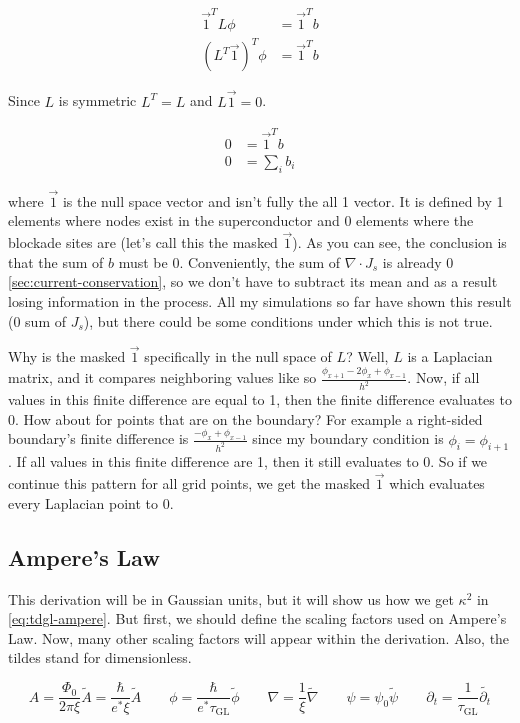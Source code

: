 \documentclass[11pt]{article}
\theoremstyle{definition}
\begin{document}
\begin{align}
\vec{1}^T L \phi &= \vec{1}^T b \label{eq:null-1}\\
(L^T \vec{1})^T \phi &= \vec{1}^T b \label{eq:null-2}
\end{align}

Since $L$ is symmetric $L^T = L$ and $L \vec{1} = 0$.

\begin{align}
0 &= \vec{1}^T b \label{eq:null-3}\\
0 &= \sum_i b_i \label{eq:null-4}
\end{align}

where $\vec{1}$ is the null space vector and isn't fully the all 1 vector. It is defined by 1 elements where nodes exist in the superconductor and 0 elements where the blockade sites are (let's call this the masked $\vec{1}$). As you can see, the conclusion is that the sum of $b$ must be 0. Conveniently, the sum of $\nabla \cdot J_s$ is already 0 \ref{sec:current-conservation}, so we don't have to subtract its mean and as a result losing information in the process. All my simulations so far have shown this result (0 sum of $J_s$), but there could be some conditions under which this is not true.

Why is the masked $\vec{1}$ specifically in the null space of $L$? Well, $L$ is a Laplacian matrix, and it compares neighboring values like so $\frac{\phi_{x+1} - 2 \phi_x + \phi_{x-1}}{h^2}$. Now, if all values in this finite difference are equal to 1, then the finite difference evaluates to 0. How about for points that are on the boundary? For example a right-sided boundary's finite difference is $\frac{-\phi_x + \phi_{x-1}}{h^2}$ since my boundary condition is $\phi_i = \phi_{i+1}$. If all values in this finite difference are 1, then it still evaluates to 0. So if we continue this pattern for all grid points, we get the masked $\vec{1}$ which evaluates every Laplacian point to 0.

\subsection{Ampere's Law}
\label{sec:ampere}

This derivation will be in Gaussian units, but it will show us how we get $\kappa^2$ in \cref{eq:tdgl-ampere}. But first, we should define the scaling factors used on Ampere's Law. Now, many other scaling factors will appear within the derivation. Also, the tildes stand for dimensionless.

\begin{equation}
\label{eq:ampere-scales}
A = \frac{\Phi_0}{2 \pi \xi} \tilde{A} = \frac{\hbar}{e^* \xi} \tilde{A} \qquad \phi = \frac{\hbar}{e^* \tau_{\mathrm{GL}}} \tilde{\phi} \qquad \nabla = \frac{1}{\xi} \tilde{\nabla} \qquad \psi = \psi_0 \tilde{\psi} \qquad \partial_t = \frac{1}{\tau_{\mathrm{GL}}} \tilde{\partial_t}
\end{equation}
\end{document}
